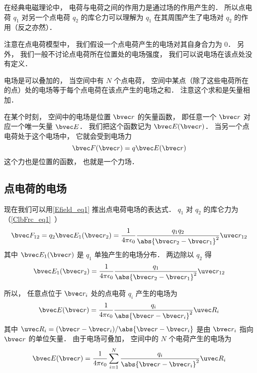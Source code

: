 
在经典电磁理论中， 电荷与电荷之间的作用力是通过场的作用产生的． 所以点电荷 $q_1$ 对另一个点电荷 $q_2$ 的库仑力可以理解为 $q_1$ 在其周围产生了电场对 $q_2$ 的作用（反之亦然）．

注意在点电荷模型中， 我们假设一个点电荷产生的电场对其自身合力为 0． 另外， 我们一般不讨论点电荷所在位置处的电场强度， 我们可以说电场在该点处没有定义．

电场是可以叠加的， 当空间中有 $N$ 个点电荷， 空间中某点（除了这些电荷所在的点）处的电场等于每个点电荷在该点产生的电场之和． 注意这个求和是矢量相加．

在某个时刻， 空间中的电场是位置 $\bvec r$ 的矢量函数， 即任意一个 $\bvec r$ 对应一个唯一矢量 $\bvec E$． 我们把这个函数记为 $\bvec E(\bvec r)$． 当另一个点电荷处于这个电场中， 它就会受到电场力
\begin{equation}\label{Efield_eq1}
\bvec F(\bvec r) = q \bvec E(\bvec r)
\end{equation}
这个力也是位置的函数， 也就是一个力场．
 
\subsection{点电荷的电场}
现在我们可以用\autoref{Efield_eq1} 推出点电荷电场的表达式． $q_1$ 对 $q_2$ 的库仑力为（\autoref{ClbFrc_eq1}~）
\begin{equation}\label{Efield_eq3}
\bvec F_{12} = q_2 \bvec E_1(\bvec r_2) = \frac{1}{4\pi\epsilon_0}\frac{q_1 q_2}{\abs{\bvec r_2 - \bvec r_1}^2} \uvec r_{12}
\end{equation}
其中 $\bvec E_1(\bvec r)$ 是 $q_1$ 单独产生的电场分布． 两边除以 $q_2$ 得
\begin{equation}
\bvec E_1(\bvec r_2) = \frac{1}{4\pi\epsilon_0}\frac{q_1}{\abs{\bvec r_2 - \bvec r_1}^2} \uvec r_{12}
\end{equation}

所以， 任意点位于 $\bvec r_i$ 处的点电荷 $q_i$ 产生的电场为
\begin{equation}\label{Efield_eq4}
\bvec E(\bvec r) = \frac{1}{4\pi\epsilon_0}\frac{q_i}{\abs{\bvec r - \bvec r_i}^2} \uvec R_i
\end{equation}
其中 $\uvec R_i = (\bvec r - \bvec r_i) / \abs{\bvec r - \bvec r_i}$ 是由 $\bvec r_i$ 指向 $\bvec r$ 的单位矢量． 由于电场可叠加， 空间中的 $N$ 个电荷产生的电场为
\begin{equation}\label{Efield_eq2}
\bvec E(\bvec r) = \frac{1}{4\pi\epsilon_0} \sum_{i=1}^N \frac{q_i}{\abs{\bvec r - \bvec r_i}^2} \uvec R_i
\end{equation}

